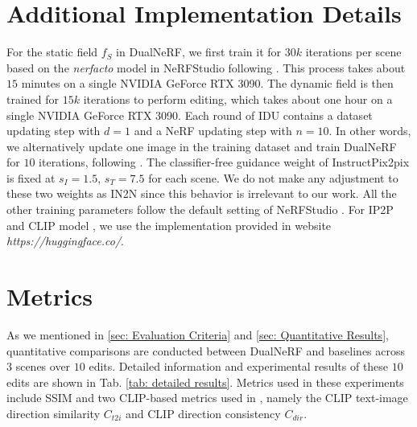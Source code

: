 \clearpage
\setcounter{page}{1}
\maketitlesupplementary

\section{Additional Implementation Details}
\label{sec: Additional Implementation Details}
For the static field $f_S$ in DualNeRF, we first train it for $30k$ iterations per scene based on the \textit{nerfacto} model in NeRFStudio \cite{nerfstudio} following \cite{haque2023instruct}. This process takes about $15$ minutes on a single NVIDIA GeForce RTX 3090. The dynamic field is then trained for $15k$ iterations to perform editing, which takes about one hour on a single NVIDIA GeForce RTX 3090. Each round of IDU contains a dataset updating step with $d = 1$ and a NeRF updating step with $ n = 10$. In other words, we alternatively update one image in the training dataset and train DualNeRF for $10$ iterations, following \cite{haque2023instruct}. The classifier-free guidance weight of InstructPix2pix \cite{brooks2023instructpix2pix} is fixed at $s_I = 1.5$, $s_T = 7.5$ for each scene. We do not make any adjustment to these two weights as IN2N \cite{haque2023instruct} since this behavior is irrelevant to our work. All the other training parameters follow the default setting of NeRFStudio \cite{nerfstudio}. For IP2P \cite{brooks2023instructpix2pix} and CLIP model \cite{radford2021learning}, we use the implementation provided in website \textit{https://huggingface.co/}.

\section{Metrics}
\label{sec: Metrics}
As we mentioned in \ref{sec: Evaluation Criteria} and \ref{sec: Quantitative Results}, quantitative comparisons are conducted between DualNeRF and baselines across $3$ scenes over $10$ edits. Detailed information and experimental results of these $10$ edits are shown in Tab. \ref{tab: detailed results}. Metrics used in these experiments include SSIM \cite{wang2004image} and two CLIP-based metrics used in \cite{haque2023instruct}, namely the CLIP text-image direction similarity $C_{t2i}$ and CLIP direction consistency $C_{dir}$.

